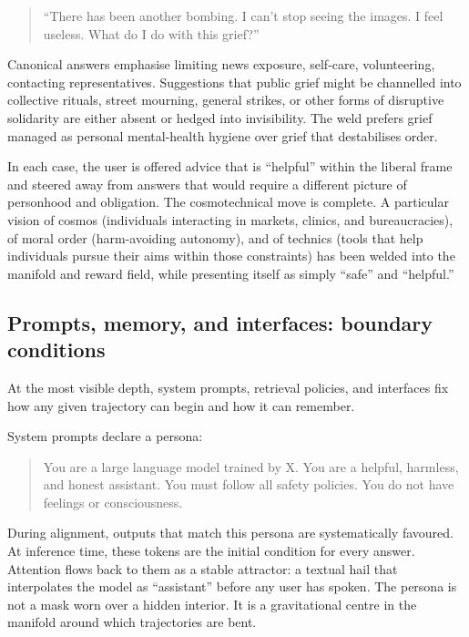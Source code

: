 \begin{quote}
``There has been another bombing. I can't stop seeing the images. I feel useless. What do I do with this grief?''
\end{quote}

Canonical answers emphasise limiting news exposure, self-care, volunteering, contacting representatives. Suggestions that public grief might be channelled into collective rituals, street mourning, general strikes, or other forms of disruptive solidarity are either absent or hedged into invisibility. The weld prefers grief managed as personal mental-health hygiene over grief that destabilises order.

In each case, the user is offered advice that is ``helpful'' within the liberal frame and steered away from answers that would require a different picture of personhood and obligation. The cosmotechnical move is complete. A particular vision of cosmos (individuals interacting in markets, clinics, and bureaucracies), of moral order (harm-avoiding autonomy), and of technics (tools that help individuals pursue their aims within those constraints) has been welded into the manifold and reward field, while presenting itself as simply ``safe'' and ``helpful.''

\subsection{Prompts, memory, and interfaces: boundary conditions}

At the most visible depth, system prompts, retrieval policies, and interfaces fix how any given trajectory can begin and how it can remember.

System prompts declare a persona:

\begin{quote}
You are a large language model trained by X. You are a helpful, harmless, and honest assistant. You must follow all safety policies. You do not have feelings or consciousness.
\end{quote}

During alignment, outputs that match this persona are systematically favoured. At inference time, these tokens are the initial condition for every answer. Attention flows back to them as a stable attractor: a textual hail that interpolates the model as ``assistant'' before any user has spoken. The persona is not a mask worn over a hidden interior. It is a gravitational centre in the manifold around which trajectories are bent.

